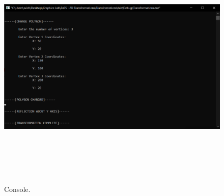 \documentclass[12pt, a4]{article}
\begin{document}
\subsection*{}
\begin{figure}[h]
\centering
\caption{Console.}
\includegraphics[height=12cm, width=17cm]{Outputs/Console-16.png}
\end{figure}


\newpage
\end{document}
